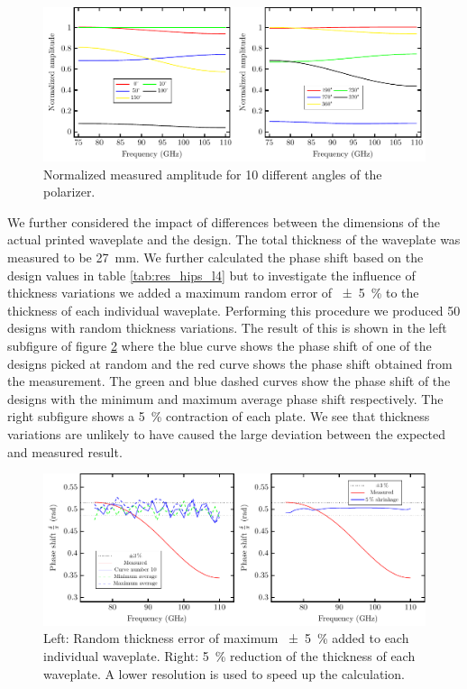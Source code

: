 \begin{figure}[H]
    \centering
    \includegraphics[scale=0.7]{images/results/plots/polymer/measured_amplitude.pdf}
    \caption{Normalized measured amplitude for 10 different angles of the polarizer.}
    \label{fig:measured_amplitude}
\end{figure}

We further considered the impact of differences between the dimensions of the actual printed waveplate and the design. The total thickness of the waveplate was measured to be \SI{27}{\milli \meter}. We further calculated the phase shift based on the design values in table \ref{tab:res_hips_l4} but to investigate the influence of thickness variations we added a maximum random error of \SI{\pm 5}{\percent} to the thickness of each individual waveplate. Performing this procedure we produced 50 designs with random thickness variations. The result of this is shown in the left subfigure of figure \ref{fig:delta_width_err} where the blue curve shows the phase shift of one of the designs picked at random and the red curve shows the phase shift obtained from the measurement. The green and blue dashed curves show the phase shift of the designs with the minimum and  maximum  average  phase shift respectively. The right subfigure shows a \SI{5}{\percent} contraction of each plate. We see that thickness variations are unlikely to have caused the large deviation between the expected and measured result.

\begin{figure}[H]
    \centering
    \includegraphics[scale=0.7]{images/results/plots/polymer/dimension_errors/delta_width_error.pdf}
    \caption{Left: Random thickness error of maximum \SI{\pm 5}{\percent} added to each individual waveplate. Right: \SI{5}{\percent} reduction of the thickness of each waveplate. A lower resolution is used to speed up the calculation.}
    \label{fig:delta_width_err}
\end{figure}

